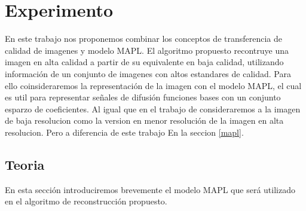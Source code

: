 \documentclass[11pt,a4paper,twoside]{tesis}
\begin{document}
\def\titulo{Licenciado }

\def\autor{Leonel Exequiel G\'omez}
\def\tituloTesis{La Guerra de las Galaxias: \mbox{Rebelión e Imperio}}
\def\runtitulo{La Guerra de las Galaxias: Rebelión e Imperio}
\def\runtitle{Star Wars: Rebellion and Empire}
\def\director{Obi-Wan Kenobi}
\def\codirector{Master Yoda}
\def\lugar{Buenos Aires, 2011}


\frontmatter
\pagestyle{empty}


\cleardoublepage


\cleardoublepage

\cleardoublepage

\cleardoublepage
\tableofcontents

\mainmatter
\pagestyle{headings}







\chapter{Experimento}

En este trabajo nos proponemos combinar los conceptos de transferencia de calidad de imagenes y 
modelo MAPL. El algoritmo propuesto recontruye una imagen en alta calidad a partir de su 
equivalente en baja calidad, utilizando informaci\'on de un conjunto de imagenes con altos 
estandares de calidad. Para ello coinsideraremos la representaci\'on de la imagen con el modelo 
MAPL, el cual es util para representar se\~nales de difusi\'on funciones bases con un conjunto 
esparzo de coeficientes. Al igual que en el trabajo de \citep{Ning2016} consideraremos a la 
imagen de baja resolucion como la version en menor resoluci\'on de la imagen en alta resolucion. 
Pero a diferencia de este trabajo En la seccion \ref{mapl}.

\section{Teoria}

En esta secci\'on introduciremos brevemente el modelo MAPL que ser\'a utilizado en el algoritmo de 
reconstrucci\'on propuesto.
\end{document}

